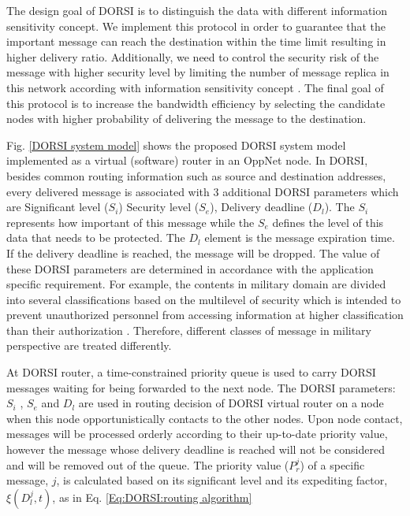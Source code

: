 The design goal of DORSI is to distinguish the data with different information sensitivity concept. 
We implement this protocol in order to guarantee that the important message can reach the destination within the time limit resulting in higher delivery ratio. 
Additionally, we need to control the security risk of the message with higher security level by limiting the number of message replica in this network according with information sensitivity concept \cite{Kotrappa2010,marking2010}. 
The final goal of this protocol is to increase the bandwidth efficiency by selecting the candidate nodes with higher probability of delivering the message to the destination.

Fig. \ref{DORSI system model} shows the proposed DORSI system model implemented as a virtual (software) router in an OppNet node. 
In DORSI, besides common routing information such as source and destination addresses, every delivered message is associated with 3 additional DORSI parameters which are Significant level ($S_i$) Security level ($S_e$), Delivery deadline ($D_l$). 
The $S_i$ represents how important of this message while the $S_e$ defines the level of this data that needs to be protected. 
The $D_l$ element is the message expiration time. 
If the delivery deadline is reached, the message will be dropped. 
The value of these DORSI parameters are determined in accordance with the application specific requirement. 
For example, the contents in military domain are divided into several classifications based on the multilevel of security which is intended to prevent unauthorized personnel from accessing information at higher classification than their authorization \cite{Winjum2008}. 
Therefore, different classes of message in military perspective are treated differently.


At DORSI router, a time-constrained priority queue is used to carry DORSI messages waiting for being forwarded to the next node. 
The DORSI parameters: $S_i$ , $S_e$ and $D_l$ are used in routing decision of DORSI virtual router on a node when this node opportunistically contacts to the other nodes. 
Upon node contact, messages will be processed orderly according to their up-to-date priority value, however the message whose delivery deadline is reached will not be considered and will be removed out of the queue. 
The priority value ($P_r^j$) of a specific message, $j$, is calculated based on its significant level and its expediting factor, $\xi(D_l^j, t)$, as in Eq. \ref{Eq:DORSI:routing algorithm}

